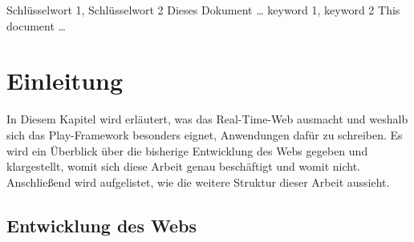 \documentclass[draft=false
              ,paper=a4
              ,twoside=false
              ,fontsize=11pt
              ,headsepline
              ,BCOR10mm
              ,DIV11
              ]{scrbook}
\begin{document}
\lstset{language=Scala}


\frontmatter

\maketitle

\onehalfspacing

\HAWAbstractPage
{Schlüsselwort 1, Schlüsselwort 2}%
{Dieses Dokument \ldots}
{keyword 1, keyword 2}%
{This document \ldots}

\newpage
\singlespacing

\tableofcontents
\newpage
\lstlistoflistings

\mainmatter
\onehalfspacing



\chapter{Einleitung} %
\label{cha:einleitung}

In Diesem Kapitel wird erläutert, was das Real-Time-Web ausmacht und weshalb sich das Play-Framework besonders eignet, Anwendungen dafür zu schreiben.
Es wird ein Überblick über die bisherige Entwicklung des Webs gegeben und klargestellt, womit sich diese Arbeit genau beschäftigt und womit nicht.
Anschließend wird aufgelistet, wie die weitere Struktur dieser Arbeit aussieht.


\section{Entwicklung des Webs} %
\label{sec:entwicklung_des_webs}
\end{document}
